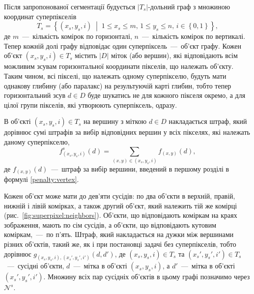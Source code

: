 Після запропонованої сегментації будується
$\left| T_s \right|$-дольний граф з множиною координат суперпікселів
\begin{equation*}
    T_s = \left\{
        \left(x_s, y_s, i \right) \; \middle| \;
        1 \le x_s \le m, \,
        1 \le y_s \le n, \,
        i \in \left\{ 0, 1 \right\}
    \right\},
\end{equation*}
де $m$~---~кількість комірок по горизонталі,
$n$~---~кількість комірок по вертикалі.
Тепер кожній долі графу відповідає один суперпіксель~---~об'єкт графу.
Кожен об'єкт $\left(x_s, y_s, i \right) \in T_s$ містить
$ \left| D \right|$ міток (або вершин),
які відповідають всім можливим зсувам горизонтальної координати пікселів,
що належать об'єкту.
Таким чином, всі пікселі, що належать одному суперпікселю,
будуть мати однакову глибину (або паралакс) на результуючій карті глибин,
тобто тепер горизонтальний зсув $d \in D$
буде шукатись не для кожного пікселя окремо, а для цілої групи пікселів,
які утворюють суперпіксель, одразу.

В об'єкті $\left(x_s, y_s, i \right) \in T_s$ на вершину з міткою $d \in D$
накладається штраф,
який дорівнює сумі штрафів за вибір відповідних вершин у всіх пікселях,
які належать даному суперпікселю,
\begin{equation*}
    f_{\left(x_s, y_s, i\right)}^s \left( d \right) =
    \sum \limits_{\left(x, y \right) \in \left(x_s, y_s, i \right)}
        f_{\left(x, y \right)} \left( d \right),
\end{equation*}
де $f_{\left(x, y \right)} \left( d \right)$~---~штраф за вибір вершини,
введений в першому розділі в формулі \eqref{penalty:vertex}.

Кожен об'єкт може мати до дев'яти сусідів: по два об'єкти в верхній, правій,
нижній і лівій комірках, а також другий об'єкт,
який належить тій же комірці (рис.~\ref{fig:superpixel:neighbors}).
Об'єкти, що відповідають коміркам на краях зображення, мають по сім сусідів,
а об'єкти, що відповідають кутовим коміркам,~---~по п'ять.
Штраф, який накладається на дужки між вершинами різних об'єктів, такий же,
як і при постановці задачі без суперпікселів, тобто дорівнює
$g_{\left(x_s, y_s, i \right), \left(x_s', y_s', i' \right)}
    \left(d, d' \right)$,
де $\left(x_s, y_s, i \right) \in T_s$ та
$\left(x_s', y_s', i' \right) \in T_s$~---~сусідні об'єкти,
$d$~---~мітка в об'єкті $\left(x_s, y_s, i \right)$,
а $d'$~---~мітка в об'єкті $\left(x_s', y_s', i' \right)$.
Множину всіх пар сусідніх об'єктів в цьому графі позначимо через $\mathcal{N}^s$.

